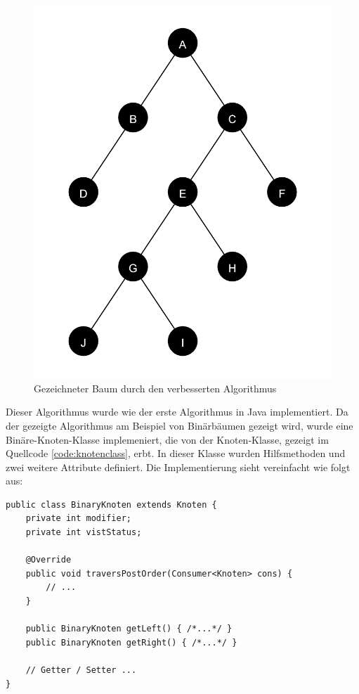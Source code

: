 \begin{figure}[H]
    \centering
    \includegraphics[scale = 0.10]{abbildungen/baum_algo_2}
    \caption{Gezeichneter Baum durch den verbesserten Algorithmus}
    \label{pic:baum_algo_2} 
\end{figure}

Dieser Algorithmus wurde wie der erste Algorithmus in Java implementiert. Da der gezeigte Algorithmus
am Beispiel von Binärbäumen gezeigt wird, wurde eine Binäre-Knoten-Klasse implemeniert,
die von der Knoten-Klasse, gezeigt im Quellcode \ref{code:knotenclass}, erbt. In dieser Klasse wurden
Hilfsmethoden und zwei weitere Attribute definiert. Die Implementierung sieht vereinfacht wie folgt aus:

\begin{lstlisting}[caption=Vereinfachte Implementierung der BinaryKnoten-Klasse, label=code:binaryknotenclass]
public class BinaryKnoten extends Knoten {
    private int modifier;
	private int vistStatus;

    @Override
	public void traversPostOrder(Consumer<Knoten> cons) { 
        // ...
    }

    public BinaryKnoten getLeft() { /*...*/ }
    public BinaryKnoten getRight() { /*...*/ }

    // Getter / Setter ...
}
\end{lstlisting}

